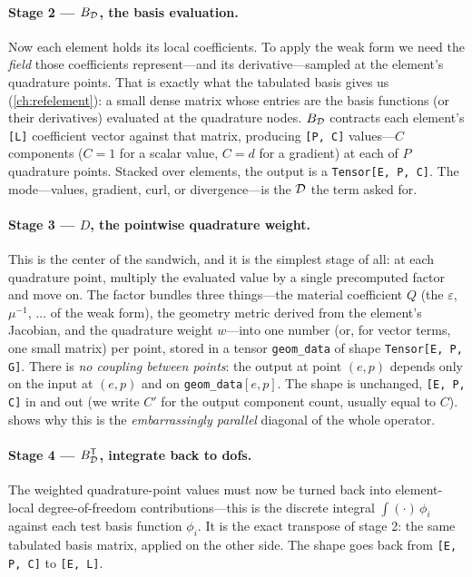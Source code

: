 \paragraph{Stage 2 --- $B_{\mathcal{D}}$, the basis evaluation.}
Now each element holds its local coefficients. To apply the weak form we need the
\emph{field} those coefficients represent---and its derivative---sampled at the
element's quadrature points. That is exactly what the tabulated basis gives us
(\cref{ch:refelement}): a small dense matrix whose entries are the basis
functions (or their derivatives) evaluated at the quadrature nodes. $B_{\mathcal{D}}$
contracts each element's \lstinline[style=l4style]|[L]| coefficient vector against
that matrix, producing \lstinline[style=l4style]|[P, C]| values---$C$ components
($C=1$ for a scalar value, $C=d$ for a gradient) at each of $P$ quadrature points.
Stacked over elements, the output is a \lstinline[style=l4style]|Tensor[E, P, C]|.
The mode---values, gradient, curl, or divergence---is the $\mathcal{D}$ the term
asked for.

\paragraph{Stage 3 --- $D$, the pointwise quadrature weight.}
This is the center of the sandwich, and it is the simplest stage of all: at each
quadrature point, multiply the evaluated value by a single precomputed factor and
move on. The factor bundles three things---the material coefficient $Q$ (the
$\varepsilon$, $\mu^{-1}$, $\dots$ of the weak form), the geometry metric derived
from the element's Jacobian, and the quadrature weight $w$---into one number (or,
for vector terms, one small matrix) per point, stored in a tensor
\texttt{geom\_data} of shape \lstinline[style=l4style]|Tensor[E, P, G]|. There is
\emph{no coupling between points}: the output at point $(e,p)$ depends only on the
input at $(e,p)$ and on \texttt{geom\_data}$[e,p]$. The shape is unchanged,
\lstinline[style=l4style]|[E, P, C]| in and out (we write $C'$ for the output
component count, usually equal to $C$).  shows why this is
the \emph{embarrassingly parallel} diagonal of the whole operator.

\paragraph{Stage 4 --- $B_{\mathcal{D}}^{\mathsf T}$, integrate back to dofs.}
The weighted quadrature-point values must now be turned back into element-local
degree-of-freedom contributions---this is the discrete integral $\int (\cdot)\,
\phi_i$ against each test basis function $\phi_i$. It is the exact transpose of
stage 2: the same tabulated basis matrix, applied on the other side. The shape
goes back from \lstinline[style=l4style]|[E, P, C]| to
\lstinline[style=l4style]|[E, L]|.

